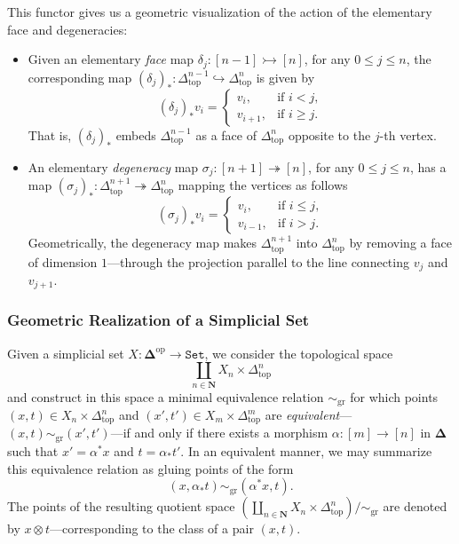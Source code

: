 \documentclass[11pt, reqno]{amsart}
\theoremstyle{definition}
\renewcommand{\leq}{\leqslant}
\renewcommand{\geq}{\geqslant}
\newcommand{\mono}{\rightarrowtail}
\newcommand{\epi}{\twoheadrightarrow}
\newcommand{\emb}{\hookrightarrow}
\newcommand{\N}{\mathbf{N}}
\newcommand{\catfont}{\texttt}
\newcommand{\op}{\mathrm{op}}
\newcommand{\Set}{{\catfont{Set}}}          %
\newcommand{\Splx}{{\mathbf{\Delta}}}           %
\newcommand{\splxtop}{\Delta_{\text{top}}}
\begin{document}
This functor gives us a geometric visualization of the action of the elementary
face and degeneracies:
\begin{itemize}\setlength\itemsep{0em}
\item Given an elementary \emph{face} map \(\delta_j: [n-1] \mono [n]\), for any
  \(0 \leq j \leq n\), the corresponding map
  \((\delta_j)_{*}: \splxtop^{n-1} \emb \splxtop^n\) is given by
  \[
  (\delta_j)_{*} v_i =
  \begin{cases}
    v_i, &\text{if } i < j, \\
    v_{i+1}, &\text{if } i \geq j.
  \end{cases}
  \]
  That is, \((\delta_j)_{*}\) embeds \(\splxtop^{n-1}\) as a face of
  \(\splxtop^n\) opposite to the \(j\)-th vertex.

\item An elementary \emph{degeneracy} map \(\sigma_j: [n+1] \epi [n]\), for any
  \(0 \leq j \leq n\), has a map
  \((\sigma_j)_{*}: \splxtop^{n+1} \epi \splxtop^n\) mapping the vertices as
  follows
  \[
  (\sigma_j)_{*} v_i =
  \begin{cases}
    v_i, &\text{if } i \leq j, \\
    v_{i-1}, &\text{if } i > j.
  \end{cases}
  \]
  Geometrically, the degeneracy map makes \(\splxtop^{n+1}\) into \(\splxtop^n\)
  by removing a face of dimension \(1\)---through the projection parallel to the
  line connecting \(v_j\) and \(v_{j+1}\).
\end{itemize}

\subsubsection{Geometric Realization of a Simplicial Set}

Given a simplicial set \(X: \Splx^{\op} \to \Set\), we consider the topological
space
\[
\coprod_{n \in \N} X_n \times \splxtop^n
\]
and construct in this space a minimal equivalence relation \(\sim_{\text{gr}}\)
for which points \((x, t) \in X_n \times \splxtop^n\) and
\((x', t') \in X_m \times \splxtop^m\) are
\emph{equivalent}---\((x, t) \sim_{\text{gr}} (x', t')\)---if and only if there
exists a morphism \(\alpha: [m] \to [n]\) in \(\Splx\) such that
\(x' = \alpha^{*} x\) and \(t = \alpha_{*} t'\). In an equivalent manner, we may
summarize this equivalence relation as gluing points of the form
\[
(x, \alpha_{*} t) \sim_{\text{gr}} (\alpha^{*} x, t).
\]
The points of the resulting quotient space
\((\coprod_{n \in \N} X_n \times \splxtop^n)/{\sim_{\text{gr}}}\) are denoted by
\(x \otimes t\)---corresponding to the class of a pair \((x, t)\).
\end{document}
